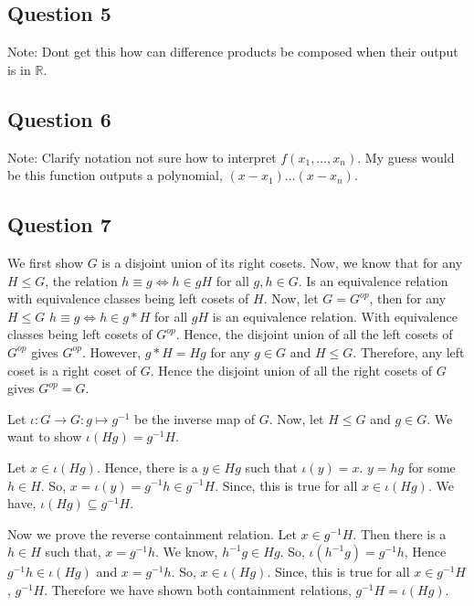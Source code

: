 \subsection{Question 5}
Note: Dont get this how can difference products be composed when their output is in \( \mathbb{R} \).

\subsection{Question 6}
Note: Clarify notation not sure how to interpret \( f(x_{1},\ldots,x_{n}) \). My guess would be this
function outputs a polynomial, \( (x-x_1)\ldots(x-x_n) \).

\subsection{Question 7}
 We first show
\( G \) is a disjoint union of its right cosets. Now, we know that
for any \( H \le G \), the relation \( h \equiv g \iff  h \in gH   \) for all \( g,h \in G \).
Is an equivalence relation with equivalence classes being left cosets of \( H \).
Now, let \( G = G^{op} \), then for any \( H \le  G \) 
\( h \equiv g \iff h \in g * H \) for all \( gH \) is an equivalence relation. 
With equivalence classes being left cosets of \( G^{op} \). Hence, 
the disjoint union of all the left cosets of \( G^{op} \) gives \( G^{op} \). However, 
\( g* H = Hg \) for any \( g \in G \) and \( H \le G \). Therefore, any left coset
is a right coset of \( G \). Hence the disjoint union of all the right cosets of 
\( G \) gives \( G^{op} = G \).

Let
\( \iota: G \to G: g \mapsto g^{-1}   \) be the inverse map of \( G \). Now,
let \( H \le G \) and \( g \in  G \). We want to show \( \iota \left( Hg \right) =  g^{-1}H\).

Let \( x \in \iota \left( Hg \right) \). Hence, there is a \( y \in Hg \) such that
\( \iota \left( y \right) = x \). \( y = hg \) for some \( h \in H \). So,
\( x = \iota \left( y \right) = g^{-1} h \in g^{-1}H\).
Since, this is true for all \( x \in \iota  \left( Hg \right) \). 
We have, \( \iota \left( Hg  \right) \subseteq g^{-1}H \).

Now we prove the reverse containment relation.
Let \( x \in g^{-1}H \). Then there is a \( h \in H  \) such that, \( x = g^{-1} h \).
We know, \( h^{-1}g \in Hg \). So, \( \iota \left( h^{-1}g \right) = g^{-1}h \), Hence
\( g^{-1}h \in  \iota \left( Hg \right)\) and \( x = g^{-1}h \). So, 
\( x \in \iota \left( Hg \right) \). Since, this is true for all \( x \in g^{-1}H \), 
\( g^{-1} H \). Therefore we have shown both containment relations, \( g^{-1}H = \iota (Hg) \).

